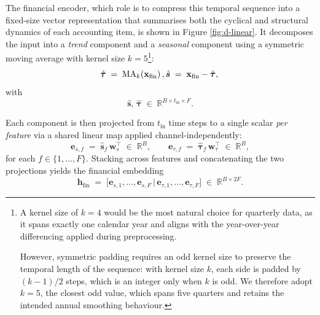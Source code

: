 \documentclass[a4paper,fleqn]{cas-dc}
\begin{document}
The financial encoder, which role is to compress this temporal sequence into a fixed-size vector representation that summarises both the cyclical and structural dynamics of each accounting item, is shown in Figure \ref{fig:d-linear}. It decomposes the input into a \emph{trend} component and a
\emph{seasonal} component using a symmetric moving average with kernel
size $k=5$\footnote{A kernel size of $k=4$ would be the most natural choice for quarterly data, as it spans exactly one calendar year and aligns with the year-over-year differencing applied during preprocessing.

However, symmetric padding requires an odd kernel size to preserve the temporal length of the sequence: with kernel size $k$, each side is padded by $(k-1)/2$ steps, which is an integer only when $k$ is odd.  We therefore adopt $k=5$, the closest odd value, which spans five quarters and retains the intended annual smoothing behaviour.}:
\begin{equation}
  \hat{\bm{\tau}} \;=\; \mathrm{MA}_k\!\left(\textbf{x}_{\mathrm{fin}}\right), \\
  \hat{\bm{s}} \;=\; \textbf{x}_{\mathrm{fin}} - \hat{\bm{\tau}},\\
\end{equation}
with
\begin{equation*}
     \hat{\bm{s}},\, \hat{\bm{\tau}} \;\in\; \mathbb{R}^{B \times t_{\mathrm{in}} \times F}.
\end{equation*}

Each component is then projected from $t_{\mathrm{in}}$ time steps to a single scalar
\emph{per feature} via a shared linear map applied channel-independently:
\begin{equation}
  \bm{e}_{s,f} \;=\; \hat{\bm{s}}_{f}\,\mathbf{w}_s^{\!\top} \;\in\; \mathbb{R}^{B},
  \qquad
  \bm{e}_{\tau,f} \;=\; \hat{\bm{\tau}}_{f}\,\mathbf{w}_\tau^{\!\top} \;\in\; \mathbb{R}^{B},
\end{equation}
for each $f \in \{1,\dots,F\}$.  Stacking across features and concatenating the two
projections yields the financial embedding
\begin{equation}
  \textbf{h}_{\mathrm{fin}} \;=\;
  \bigl[\bm{e}_{s,1},\dots,\bm{e}_{s,F}\,\big|\,
        \bm{e}_{\tau,1},\dots,\bm{e}_{\tau,F}\bigr]
  \;\in\; \mathbb{R}^{B \times 2F}.
\end{equation}
\end{document}
